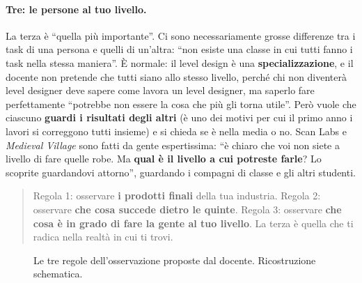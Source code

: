 \paragraph{Tre: le persone al tuo livello.} La terza è ``quella più importante''. Ci
sono necessariamente grosse differenze tra i task di una persona e quelli di
un'altra: ``non esiste una classe in cui tutti fanno i task nella stessa maniera''.
È normale: il level design è una \textbf{specializzazione}, e il docente non pretende
che tutti siano allo stesso livello, perché chi non diventerà level designer deve
sapere come lavora un level designer, ma saperlo fare perfettamente ``potrebbe non
essere la cosa che più gli torna utile''. Però vuole che ciascuno \textbf{guardi i
risultati degli altri} (è uno dei motivi per cui il primo anno i lavori si
correggono tutti insieme) e si chieda se è nella media o no. Scan Labs e
\emph{Medieval Village} sono fatti da gente espertissima: ``è chiaro che voi non
siete a livello di fare quelle robe. Ma \textbf{qual è il livello a cui potreste
farle}? Lo scoprite guardandovi attorno'', guardando i compagni di classe e gli
altri studenti.

\begin{quote}
Regola 1: osservare \textbf{i prodotti finali} della tua industria. Regola 2:
osservare \textbf{che cosa succede dietro le quinte}. Regola 3: osservare
\textbf{che cosa è in grado di fare la gente al tuo livello}. La terza è quella che ti
radica nella realtà in cui ti trovi.
\end{quote}

\begin{figure}[htbp]
\centering
{}
\caption{Le tre regole dell'osservazione proposte dal docente. Ricostruzione
schematica.}
\label{gd14:fig:osservare}
\end{figure}

